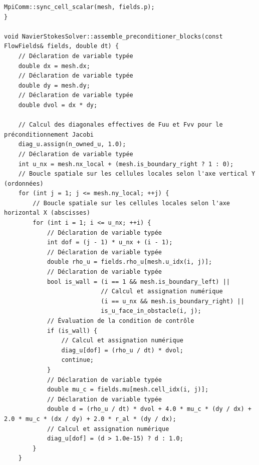 \documentclass[10pt,a4paper,oneside]{book}
\begin{document}
\begin{lstlisting}[language={[11]C++}]
    MpiComm::sync_cell_scalar(mesh, fields.p);
}

void NavierStokesSolver::assemble_preconditioner_blocks(const FlowFields& fields, double dt) {
    // Déclaration de variable typée
    double dx = mesh.dx;
    // Déclaration de variable typée
    double dy = mesh.dy;
    // Déclaration de variable typée
    double dvol = dx * dy;

    // Calcul des diagonales effectives de Fuu et Fvv pour le préconditionnement Jacobi
    diag_u.assign(n_owned_u, 1.0);
    // Déclaration de variable typée
    int u_nx = mesh.nx_local + (mesh.is_boundary_right ? 1 : 0);
    // Boucle spatiale sur les cellules locales selon l'axe vertical Y (ordonnées)
    for (int j = 1; j <= mesh.ny_local; ++j) {
        // Boucle spatiale sur les cellules locales selon l'axe horizontal X (abscisses)
        for (int i = 1; i <= u_nx; ++i) {
            // Déclaration de variable typée
            int dof = (j - 1) * u_nx + (i - 1);
            // Déclaration de variable typée
            double rho_u = fields.rho_u[mesh.u_idx(i, j)];
            // Déclaration de variable typée
            bool is_wall = (i == 1 && mesh.is_boundary_left) ||
                           // Calcul et assignation numérique
                           (i == u_nx && mesh.is_boundary_right) ||
                           is_u_face_in_obstacle(i, j);
            // Évaluation de la condition de contrôle
            if (is_wall) {
                // Calcul et assignation numérique
                diag_u[dof] = (rho_u / dt) * dvol;
                continue;
            }
            // Déclaration de variable typée
            double mu_c = fields.mu[mesh.cell_idx(i, j)];
            // Déclaration de variable typée
            double d = (rho_u / dt) * dvol + 4.0 * mu_c * (dy / dx) + 2.0 * mu_c * (dx / dy) + 2.0 * r_al * (dy / dx);
            // Calcul et assignation numérique
            diag_u[dof] = (d > 1.0e-15) ? d : 1.0;
        }
    }


\end{lstlisting}
\end{document}
